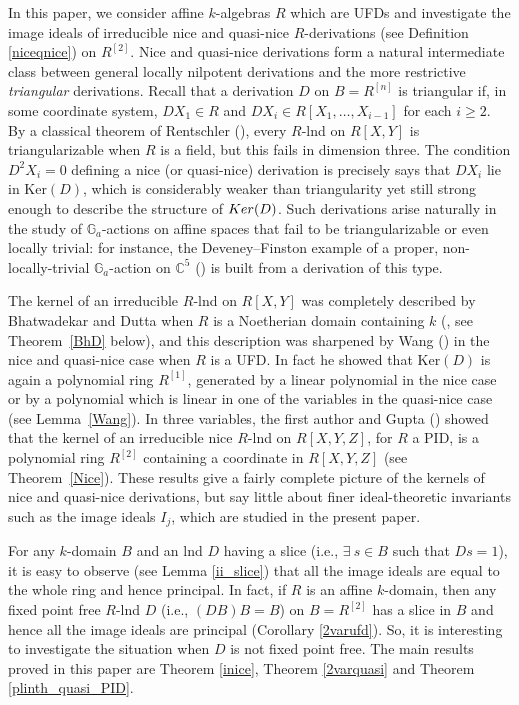 \documentclass[a4paper,12pt]{article}
\begin{document}
{	\medskip
	\indent
	In this paper, we consider affine $k$-algebras $R$ which are UFDs and  investigate the image ideals of irreducible nice and quasi-nice $R$-derivations (see Definition \ref{niceqnice}) on $R^{[2]}$. Nice and quasi-nice derivations form a natural intermediate class between
general locally nilpotent derivations and the more restrictive \emph{triangular}
derivations. Recall that a derivation $D$ on $B = R^{[n]}$ is triangular if,
in some coordinate system, $DX_1\in R$ and  $DX_i \in R[X_1, \ldots, X_{i-1}]$ for each $i\geqslant 2$.
By a classical theorem of Rentschler (\cite{R}), every $R$-lnd on $R[X,Y]$ is
triangularizable when $R$ is a field, but this fails in dimension
three. The condition $D^2 X_i = 0$ defining a nice (or quasi-nice)
derivation is precisely says that $DX_i$ lie in $\mathrm{Ker}(D)$,
which is considerably weaker than  triangularity yet still strong
enough to describe the structure of ${\rm Ker}(D)$. Such
derivations arise naturally in the study of $\mathbb{G}_a$-actions on affine
spaces that fail to be triangularizable or even locally trivial: for
instance, the Deveney--Finston example of a proper, non-locally-trivial
$\mathbb{G}_a$-action on $\mathbb{C}^5$ (\cite{DeF}) is built
from a derivation of this type.

\smallskip\noindent The kernel of an irreducible $R$-lnd on $R[X,Y]$ was completely described
by Bhatwadekar and Dutta when $R$ is a Noetherian domain containing $k$
(\cite{BD97}, see Theorem~\ref{BhD} below), and this
description was sharpened by Wang (\cite{W}) in the nice and quasi-nice
case when $R$ is a UFD. In fact he showed that $\mathrm{Ker}(D)$ is again a polynomial ring
$R^{[1]}$, generated by a linear polynomial in the nice case or  by a polynomial which is linear in one of the variables in the quasi-nice case (see Lemma~\ref{Wang}). In three
variables, the first author and Gupta (\cite{DG}) showed that the
kernel of an irreducible nice $R$-lnd on $R[X,Y,Z]$, for $R$ a PID, is a
polynomial ring $R^{[2]}$ containing a coordinate in $R[X,Y,Z]$ (see Theorem~\ref{Nice}). These
results give a fairly complete picture of the kernels of nice and
quasi-nice derivations, but say little about finer ideal-theoretic
invariants such as the image ideals $I_j$, which are studied in the present
paper.

\medskip\noindent
For any $k$-domain $B$ and an lnd $D$ having a slice (i.e., $\exists~s\in B$ such that $Ds=1$), it is easy to observe (see Lemma \ref{ii_slice}) that all the image ideals are equal to the whole ring and hence principal. In fact, if $R$ is an affine $k$-domain, then any fixed point free $R$-lnd $D$ (i.e., $(DB)B=B$) on $B=R^{[2]}$  has a slice in $B$ and hence all the image ideals are principal (Corollary \ref{2varufd}). So, it is interesting to investigate the situation when $D$ is not fixed point free. The main results proved in this paper are Theorem \ref{inice}, Theorem \ref{2varquasi} and Theorem \ref{plinth_quasi_PID}.
	
}
\end{document}

